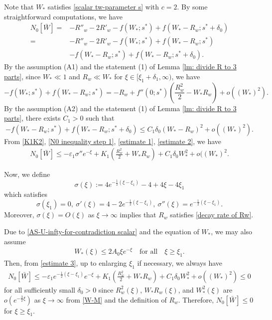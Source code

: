 \documentclass[11pt,a4paper]{article}
\numberwithin{equation}{section}
\numberwithin{figure}{section}
\newcommand\bea{\begin{eqnarray}}
\newcommand\eea{\end{eqnarray}}
\newcommand\beaa{\begin{eqnarray*}}
\newcommand\eeaa{\end{eqnarray*}}
\begin{document}
Note that $W_*$ satisfies \eqref{scalar tw-parameter s} with $c=2$.
By some  straightforward computations, we have
\begin{equation}\label{N0 inequality step 1}
\begin{aligned}
N_0[\bar W]=&-R''_w-2 R'_w-f(W_*;s^*)+f(W_*-R_w;s^*+\delta_0)\\
=&-R''_w-2 R'_w-f(W_*;s^*)+f(W_*-R_w;s^*)\\
&-f(W_*-R_w;s^*)+f(W_*-R_w;s^*+\delta_0).
\end{aligned}
\end{equation}
By the assumption (A1) and the statement (1) of Lemma \ref{lm: divide R to 3 parts}, since $W_*\ll 1$ and $R_w\ll W_*$ for $\xi\in[\xi_1+\delta_1,\infty)$, we have
\begin{equation}\label{estimate 1}
-f(W_*;s^*)+f(W_*-R_w;s^*)= -R_w+f''(0;s^*)(\frac{R^2_w}{2}-W_*R_w)+o((W_*)^2).
\end{equation}
By the assumption (A2) and the statement (1) of Lemma \ref{lm: divide R to 3 parts}, there exists $C_1>0$ such that
\begin{equation}\label{estimate 2}
-f(W_*-R_w;s^*)+f(W_*-R_w;s^*+\delta_0)\le C_1\delta_0(W_*-R_w)^2+o((W_*)^2).
\end{equation}
From \eqref{K1K2}, \eqref{N0 inequality step 1}, \eqref{estimate 1}, \eqref{estimate 2}, %
we have
\bea\label{estimate 3}
N_0[\bar W]\le -\varepsilon_1\sigma''e^{-\xi}+K_1(\frac{R_w^2}{2}+W_*R_w)+C_1\delta_0W_*^2+o((W_*)^2.
\eea


Now, we define
$$\sigma(\xi):=4e^{-\frac{1}{2}(\xi-\xi_1)}-4+4\xi-4\xi_1$$
which satisfies 
$$\sigma(\xi_1)=0,\ \sigma'(\xi)=4-2e^{-\frac{1}{2}(\xi-\xi_1)},\ \sigma''(\xi)=e^{-\frac{1}{2}(\xi-\xi_1)}.$$
Moreover, $\sigma(\xi)= O(\xi)$ as $\xi\to\infty$ implies that $R_w$ satisfies \eqref{decay rate of Rw}.

Due to \eqref{AS-U-infty-for-contradiction scalar} and the equation of $W_*$, we may also assume
\bea\label{W-M}
W_*(\xi) \leq 2A_0\xi e^{-\xi}\quad \mbox{for all}\quad\xi\geq \xi_1.
\eea
Then, from \eqref{estimate 3}, up to enlarging $\xi_1$ if necessary, we always have %
\beaa
N_0[\bar W]\le -\varepsilon_1e^{-\frac{1}{2}(\xi-\xi_1)}e^{-\xi}+K_1(\frac{R_w^2}{2}+W_*R_w)+C_1\delta_0W_*^2+o((W_*)^2)\le 0
\eeaa
for all sufficiently small $\delta_0>0$
since $R_w^2(\xi)$, $W_*R_w(\xi)$, and  $W_*^2(\xi)$ are $o(e^{-\frac{3}{2}\xi})$
as $\xi\to\infty$
from \eqref{W-M} and the definition of $R_w$.
Therefore, $N_0[\bar W]\leq 0$ for $\xi\ge \xi_1$.
\end{document}

